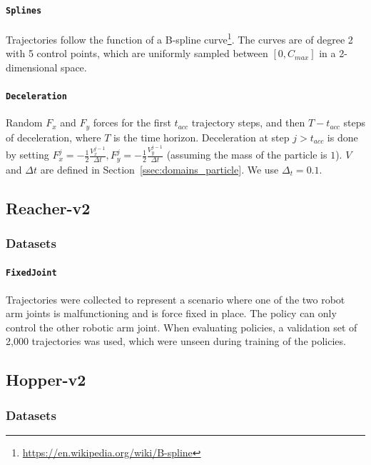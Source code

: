 \documentclass[nohyperref]{article}
\begin{document}
\paragraph{\texttt{Splines}}
Trajectories follow the function of a B-spline curve\footnote{\url{https://en.wikipedia.org/wiki/B-spline}}. The curves are of degree 2 with 5 control points, which are uniformly sampled between $[0, C_{max}]$ in a 2-dimensional space.

\paragraph{\texttt{Deceleration}}
Random $F_x$ and $F_y$ forces for the first $t_{acc}$ trajectory steps, and then $T - t_{acc}$ steps of deceleration, where $T$ is the time horizon. Deceleration at step $j>t_{acc}$ is done by setting $F_x^{j} = -\frac{1}{2}\frac{V_x^{j-1}}{\Delta t}, F_y^{j} = -\frac{1}{2}\frac{V_y^{j-1}}{\Delta t}$ (assuming the mass of the particle is $1$). $V$ and $\Delta t$ are defined in Section~\ref{ssec:domains_particle}. We use $\Delta_t = 0.1$.

\subsection{Reacher-v2}
\subsubsection{Datasets}
\label{reacher:datasets}
\paragraph{\texttt{FixedJoint}}
Trajectories were collected to represent a scenario where one of the two robot arm joints is malfunctioning and is force fixed in place. The policy can only control the other robotic arm joint. When evaluating policies, a validation set of 2,000 trajectories was used, which were unseen during training of the policies.

\subsection{Hopper-v2}
\subsubsection{Datasets}
\label{hopper:datasets}
\end{document}
